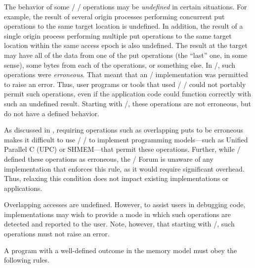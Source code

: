 The behavior of some \MPI/ \RMA/ operations may be
\emph{undefined} in certain situations.  For example, the result of
several origin processes performing concurrent put
operations to the same target location is undefined.  In addition, the
result of a single origin process performing multiple
put operations to the same target location within the
same access epoch is also undefined.
The result at the target may have all of the
data from one of the put operations (the ``last'' one,
in some sense), some bytes from each of the operations, or
something else.  In \MPIII/, such operations were \emph{erroneous}.
That meant that an \MPI/ implementation was permitted to raise an error.
Thus, user programs or tools that used \MPI/ \RMA/ could not
portably permit such operations, even if the application code could
function correctly with such an undefined result.  Starting with \MPIIII/, these
operations are not erroneous, but do not have a defined behavior.
\begin{rationale}
As discussed in \cite{journals/ijhpcn/BonacheaD04}, requiring
operations such as 
overlapping puts to be erroneous makes it difficult to use \MPI/
\RMA/ to implement programming models---such as Unified Parallel C (UPC) or SHMEM---that permit
these operations.  Further, while \MPIII/ defined these operations as
erroneous, the \MPI/ Forum is unaware of any implementation that enforces
this rule, as it would require significant overhead.  Thus, relaxing
this condition does not impact existing implementations or applications.
\end{rationale}

\begin{implementors}
Overlapping accesses are undefined. However, to assist users in
debugging code, implementations may wish to provide a mode in which such
operations are detected and reported to the user. Note, however, that starting with \MPIIII/, such operations must 
not raise an error.
\end{implementors}

A program with a well-defined outcome in the  memory model 
must obey the following rules.

